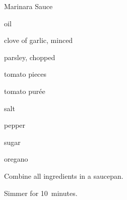 \begin{recipe}{Marinara Sauce}{}{}

\begin{ingredients}
\item {} oil
\item clove of garlic, minced
\item {} parsley, chopped
\item {} tomato pieces
\item {} tomato purée
\item {} salt
\item pepper
\item \tp{\half} sugar
\item \tp{\quarter} oregano
\end{ingredients}

\begin{directions}
\item Combine all ingredients in a saucepan.
\item Simmer for 10~minutes.
\end{directions}

\end{recipe}
